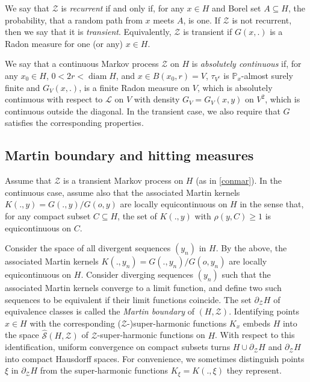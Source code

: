 \documentclass[12pt,a4paper]{amsart}
\numberwithin{equation}{section}
\theoremstyle{definition}
\DeclareMathOperator{\diam}{diam}
\def\p{\mathbb P}
\begin{document}
We say that $\mathcal Z$ is \emph{recurrent} if and only if, for any $x\in H$ and Borel set $A\subseteq H$, the probability, that a random path from $x$ meets $A$, is one.
If $\mathcal Z$ is not recurrent, then we say that it is \emph{transient}.
Equivalently, $\mathcal Z$ is transient if $G(x,.)$ is a Radon measure for one (or any) $x\in H$.

We say that a continuous Markov process $\mathcal{Z}$ on $H$ is \emph{absolutely continuous} if, for any $x_0\in H$, $0<2r<\diam H$, and $x\in B(x_0,r)=V$, $\tau_{V^c}$ is $\p_x$-almost surely finite and $G_V(x,.)$, is a finite Radon measure on $V$, which is absolutely continuous with respect to $\mathcal L$ on $V$ with density $G_V=G_V(x,y)$ on $V^2$, which is  continuous outside the diagonal.
In the transient case, we also require that $G$ satisfies the corresponding properties.

\subsection{Martin boundary and hitting measures}\label{secmart}
Assume that $\mathcal{Z}$ is a transient Markov process on $H$ (as in \ref{conmar}).
In the continuous case, assume also that the associated Martin kernels $K(.,y)=G(.,y)/G(o,y)$ are locally equicontinuous on $H$ in the sense that, for any compact subset $C\subseteq H$, the set of $K(.,y)$ with $\rho(y,C)\ge1$ is equicontinuous on $C$.

Consider the space of all divergent sequences $(y_n)$ in $H$.
By the above, the associated Martin kernels $K(.,y_n)=G(.,y_n)/G(o,y_n)$ are locally equicontinuous on $H$.
Consider diverging sequences $(y_n)$ such that the associated Martin kernels converge to a limit function, and define two such sequences to be equivalent if their limit functions coincide.
The set $\partial_{\mathcal{Z}}H$ of equivalence classes is called the \emph{Martin boundary} of $(H,\mathcal{Z})$.   
Identifying points $x\in H$ with the corresponding ($\mathcal{Z}$-)super-harmonic functions $K_x$ embeds $H$ into the space $\hat{\mathcal S}(H,\mathcal Z)$ of $\mathcal Z$-super-harmonic functions on $H$.
With respect to this identification, uniform convergence on compact subsets turns $H\cup\partial_{\mathcal{Z}}H$ and $\partial_{\mathcal{Z}}H$ into compact Hausdorff spaces.
For convenience, we sometimes distinguish points $\xi$ in $\partial_{\mathcal{Z}}H$ from the super-harmonic functions $K_\xi=K(.,\xi)$ they represent.
\end{document}
